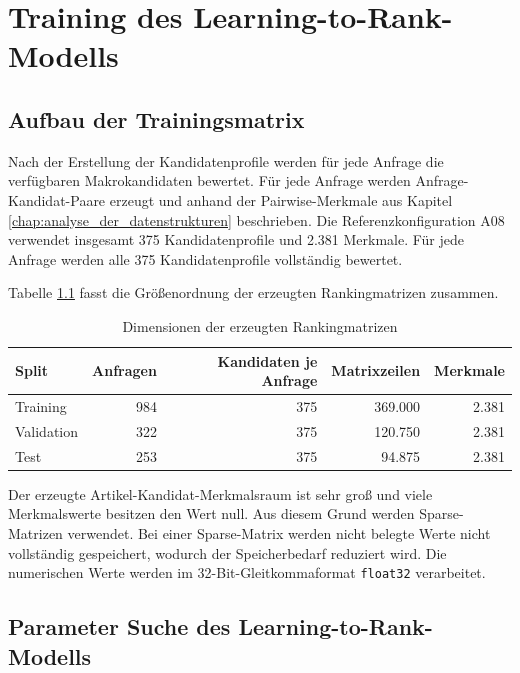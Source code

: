 \chapter{Training des Learning-to-Rank-Modells}\label{chap:training_des_learning_to_rank_modells}


\section{Aufbau der Trainingsmatrix} 

Nach der Erstellung der Kandidatenprofile werden für jede Anfrage die verfügbaren Makrokandidaten bewertet. 
Für jede Anfrage werden Anfrage-Kandidat-Paare erzeugt und anhand der Pairwise-Merkmale aus Kapitel \ref{chap:analyse_der_datenstrukturen} beschrieben. 
Die Referenzkonfiguration A08 verwendet insgesamt 375 Kandidatenprofile und 2.381 Merkmale. 
Für jede Anfrage werden alle 375 Kandidatenprofile vollständig bewertet. 

Tabelle \ref{tab:matrixdimensionen} fasst die Größenordnung der erzeugten Rankingmatrizen zusammen.

\begin{table}[H]
    \centering
    \setlength{\tabcolsep}{5pt}
    \renewcommand{\arraystretch}{1.08}
    \caption{Dimensionen der erzeugten Rankingmatrizen}
    \label{tab:matrixdimensionen}
    \begin{tabular}{lrrrr}
        \toprule
        \textbf{Split} & \textbf{Anfragen} & \textbf{Kandidaten je Anfrage} & \textbf{Matrixzeilen} & \textbf{Merkmale} \\
        \midrule
        Training & 984 & 375 & 369.000 & 2.381 \\
        Validation & 322 & 375 & 120.750 & 2.381 \\
        Test & 253 & 375 & 94.875 & 2.381 \\
        \bottomrule
    \end{tabular}
\end{table}

Der erzeugte Artikel-Kandidat-Merkmalsraum ist sehr groß und viele Merkmalswerte besitzen den Wert null. Aus diesem Grund werden Sparse-Matrizen verwendet. Bei einer Sparse-Matrix werden nicht belegte Werte nicht vollständig gespeichert, wodurch der Speicherbedarf reduziert wird. Die numerischen Werte werden im 32-Bit-Gleitkommaformat \texttt{float32} verarbeitet. 

\section{Parameter Suche des Learning-to-Rank-Modells}

